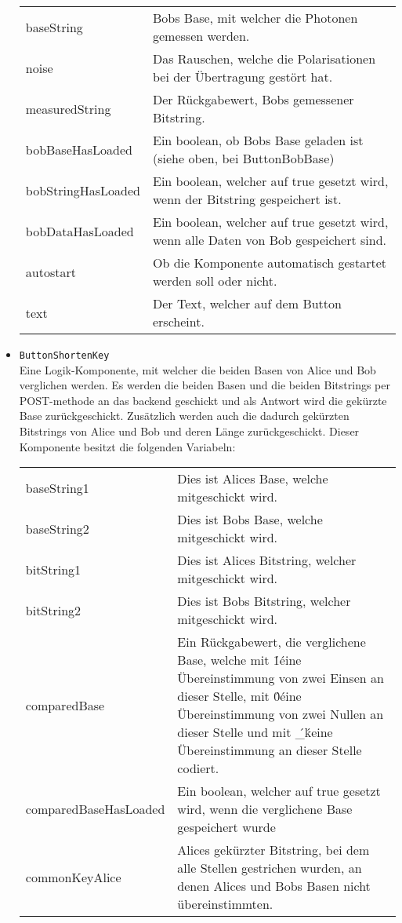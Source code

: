 \documentclass[a4paper,10.2pt,pdftex]{scrartcl}%
\begin{document}
\begin{itemize}
\begin{tabularx}{\textwidth}{p{3cm}p{11cm}}
baseString &  Bobs Base, mit welcher die Photonen gemessen werden. \\
noise &  Das Rauschen, welche die Polarisationen bei der Übertragung gestört hat. \\
measuredString &  Der Rückgabewert, Bobs gemessener Bitstring. \\
bobBaseHasLoaded & Ein boolean, ob Bobs Base geladen ist (siehe oben, bei ButtonBobBase) \\
bobStringHasLoaded & Ein boolean, welcher auf true gesetzt wird, wenn der Bitstring gespeichert ist. \\
bobDataHasLoaded &  Ein boolean, welcher auf true gesetzt wird, wenn alle Daten von Bob gespeichert sind. \\
autostart & Ob die Komponente automatisch gestartet werden soll oder nicht. \\
text & Der Text, welcher auf dem Button erscheint.
\end{tabularx}
\item \texttt{ButtonShortenKey} \\
Eine Logik-Komponente, mit welcher die beiden Basen von Alice und Bob verglichen werden. Es werden die beiden Basen und die beiden Bitstrings per POST-methode an das backend geschickt und als Antwort wird die gekürzte Base zurückgeschickt. Zusätzlich werden auch die dadurch gekürzten Bitstrings von Alice und Bob und deren Länge zurückgeschickt. Dieser Komponente besitzt die folgenden Variabeln:\\[3mm]
\begin{tabularx}{\textwidth}{p{3cm}p{11cm}} 
baseString1 & Dies ist Alices Base, welche mitgeschickt wird. \\
baseString2 & Dies ist Bobs Base, welche mitgeschickt wird. \\
bitString1 & Dies ist Alices Bitstring, welcher mitgeschickt wird. \\
bitString2 &  Dies ist Bobs Bitstring, welcher mitgeschickt wird. \\
comparedBase & Ein Rückgabewert, die verglichene Base, welche mit \'1\' eine Übereinstimmung von zwei Einsen an dieser Stelle, mit \'0\' eine Übereinstimmung von zwei Nullen an dieser Stelle und mit \'\_\' keine Übereinstimmung an dieser Stelle codiert. \\ 
comparedBaseHasLoaded &  Ein boolean, welcher auf true gesetzt wird, wenn die verglichene Base gespeichert wurde \\
commonKeyAlice &  Alices gekürzter Bitstring, bei dem alle Stellen gestrichen wurden, an denen Alices und Bobs Basen nicht übereinstimmten. \\

\end{tabularx}
\end{itemize}
\end{document}
